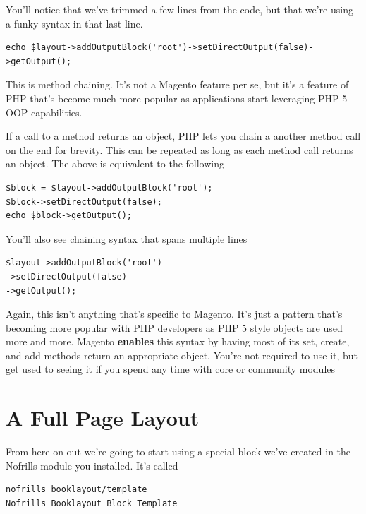 \documentclass[oneside]{book}
\begin{document}
You'll notice that we've trimmed a few lines from the code, but that we're using a funky syntax in that last line.      

\begin{lstlisting}
echo $layout->addOutputBlock('root')->setDirectOutput(false)->getOutput();      

\end{lstlisting}


This is method chaining. It's not a Magento feature per se, but it's a feature of PHP that's become much more popular as applications start leveraging PHP 5 OOP capabilities.  

If a call to a method returns an object, PHP lets you chain a another method call on the end for brevity. This can be repeated as long as each method call returns an object.  The above is equivalent to the following

\begin{lstlisting}
$block = $layout->addOutputBlock('root');
$block->setDirectOutput(false);
echo $block->getOutput();

\end{lstlisting}


You'll also see chaining syntax that spans multiple lines

\begin{lstlisting}
$layout->addOutputBlock('root')
->setDirectOutput(false)
->getOutput();      

\end{lstlisting}


Again, this isn't anything that's specific to Magento.  It's just a pattern that's becoming more popular with PHP developers as PHP 5 style objects are used more and more.  Magento \textbf{enables} this syntax by having most of its set, create, and add methods return an appropriate object. You're not required to use it, but get used to seeing it if you spend any time with core or community modules

\section{A Full Page Layout}

From here on out we're going to start using a special block we've created in the Nofrills module you installed.  It's called  

\begin{lstlisting}
nofrills_booklayout/template
Nofrills_Booklayout_Block_Template

\end{lstlisting}
\end{document}
